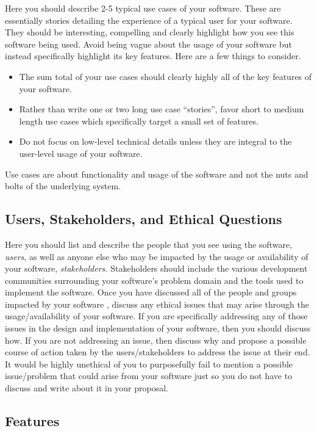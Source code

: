 \documentclass[10pt]{article}
\begin{document}
Here you should describe 2-5 typical use cases of your software.  These are essentially stories detailing the experience of a typical user for your software.  They should be interesting, compelling and clearly highlight how you see this software being used.  Avoid being vague about the usage of your software but instead specifically highlight its key features.  Here are a few things to consider.
\begin{itemize}
\item The sum total of your use cases should clearly highly all of the key features of your software.
\item Rather than write one or two long use case ``stories'', favor short to medium length use cases which specifically target a small set of features.
\item Do not focus on low-level technical details unless they are integral to the user-level usage of your software.
\end{itemize}
Use cases are about functionality and usage of the software and not the nuts and bolts of the underlying system.

\subsection{Users, Stakeholders, and Ethical Questions}

Here you should list and describe the people that you see using the software, \textit{users}, as well as anyone else who may be impacted by the usage or availability of your software, \textit{stakeholders.}  Stakeholders should include the various development communities surrounding your software's problem domain and the tools used to implement the software.  Once you have discussed all of the people and groups impacted by your software , discuss any ethical issues that may arise through the usage/availability of your software.  If you are specifically addressing any of those issues in the design and implementation of your software, then you should discuss how.  If you are not addressing an issue, then discuss why and propose a possible course of action taken by the users/stakeholders to address the issue at their end.  It would be highly unethical of you to purposefully fail to mention a possible issue/problem that could arise from your software just so you do not have to discuss and write about it in your proposal.  

\subsection{Features}
\end{document}
